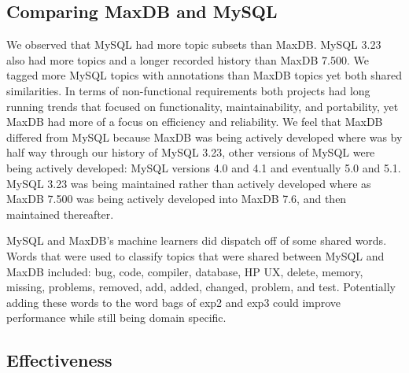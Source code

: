 \documentclass{acm_proc_article-sp}
\newcommand{\XXX}[1]{\textcolor{red}{{\it \textbf{[XXX: #1]}}}}
\begin{document}
\subsection{Comparing MaxDB and MySQL}


We observed that MySQL had more topic subsets than MaxDB. MySQL 3.23 also had more topics and a longer recorded history than MaxDB 7.500. We tagged more MySQL topics with annotations than MaxDB topics yet both shared similarities. In terms of non-functional requirements both projects had long running trends that focused on functionality, maintainability, and portability, yet MaxDB had more of a focus on efficiency and reliability. We feel that MaxDB differed from MySQL because MaxDB was being actively developed where was by half way through our history of MySQL 3.23, other versions of MySQL were being actively developed: MySQL versions 4.0 and 4.1 and eventually 5.0 and 5.1. MySQL 3.23 was being maintained rather than actively developed where as MaxDB 7.500 was being actively developed into MaxDB 7.6, and then maintained thereafter.

MySQL and MaxDB's machine learners did dispatch off of some shared words. Words that were used to classify topics that were shared between MySQL and MaxDB included: bug, code, compiler, database, HP UX, delete, memory, missing, problems, removed, add, added, changed, problem, and test. Potentially adding these words to the word bags of \textsf{exp2} and \textsf{exp3} could improve performance while still being domain specific.

\subsection{Effectiveness}

\end{document}
